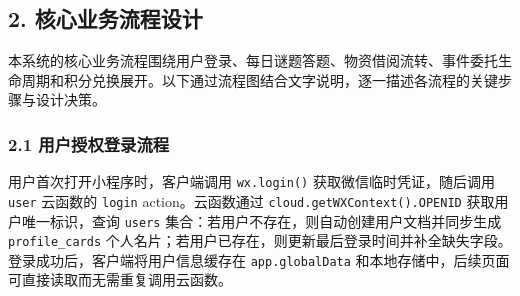 \documentclass[a4paper,12pt]{article}
\begin{document}
\subsection{2. 核心业务流程设计}

本系统的核心业务流程围绕用户登录、每日谜题答题、物资借阅流转、事件委托生命周期和积分兑换展开。以下通过流程图结合文字说明，逐一描述各流程的关键步骤与设计决策。

\subsubsection*{2.1 用户授权登录流程}

用户首次打开小程序时，客户端调用 \texttt{wx.login()} 获取微信临时凭证，随后调用 \texttt{user} 云函数的 \texttt{login} action。云函数通过 \texttt{cloud.\allowbreak getWXContext().\allowbreak OPENID} 获取用户唯一标识，查询 \texttt{users} 集合：若用户不存在，则自动创建用户文档并同步生成 \texttt{profile\_cards} 个人名片；若用户已存在，则更新最后登录时间并补全缺失字段。登录成功后，客户端将用户信息缓存在 \texttt{app.globalData} 和本地存储中，后续页面可直接读取而无需重复调用云函数。
\end{document}

